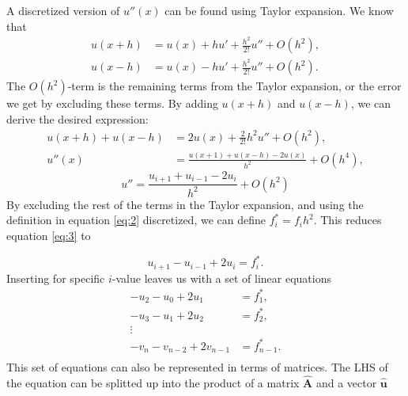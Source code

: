 \documentclass[a4paper,10pt]{article}
\begin{document}
A discretized version of $u''(x)$ can be found using Taylor expansion. We know that
\begin{align*}
u(x + h) &= u(x) + h u' + \frac{h^2}{2!} u'' + O(h^2), \\
u(x - h) &= u(x) - h u' + \frac{h^2}{2!} u'' + O(h^2). 
\end{align*} 
The $O(h^2)$-term is the remaining terms from the Taylor expansion, or the error we get by excluding these terms. By adding $u(x + h)$ and $u(x-h)$, we can derive the desired expression:
\begin{align*}
u(x + h) + u(x - h) &= 2 u(x) + \frac{2}{2!} h^2 u'' + O(h^2), \\
u''(x) &= \frac{u(x+1) + u(x-h) - 2u(x)}{h^2} + O(h^4),
\end{align*}
\begin{equation}\label{eq:3}
u'' =  \frac{u_{i+1} + u_{i-1} - 2u_i}{h^2}+ O(h^2)
\end{equation}
By excluding the rest of the terms in the Taylor expansion, and using the definition in equation \eqref{eq:2} discretized, we can define $f_i^* = f_i h^2 $. This reduces equation \eqref{eq:3} to

\begin{equation}\label{eq:4}
u_{i+1} - u_{i-1} + 2u_i = f_i^* .
\end{equation}
Inserting for specific $i$-value leaves us with a set of linear equations
\begin{align*}
-u_2 - u_0 + 2u_1 &= f_1^* , \\
-u_3 - u_1 + 2u_2 &= f_2^*,\\
\vdots \\
-v_n - v_{n-2} + 2v_{n-1} &= f_{n-1}^*. \\
\end{align*}
This set of equations can also be represented in terms of matrices. The LHS of the equation can be splitted up into the product of a matrix $\mathbf{\hat{A}}$ and a vector $\mathbf{\hat{u}}$
\end{document}

